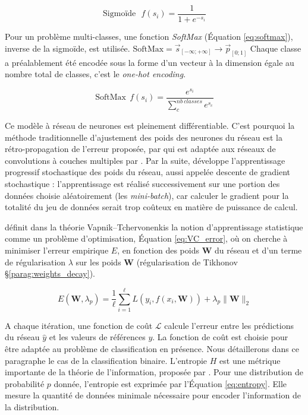\begin{equation} \label{eq:sigmoid}
\text{Sigmoïde} \ \ \ f\left(s_{i}\right)=\frac{1}{1+e^{-s_{i}}}
\end{equation}

Pour un problème multi-classes, une fonction \textit{SoftMax} (Équation \ref{eq:softmax}), inverse de la sigmoïde, est utilisée.
$\text{SoftMax} = \vec{s}_{[-\infty; +\infty]} \to \vec{p}_{[0 ; 1]}$
Chaque classe a préalablement été encodée sous la forme d'un vecteur à la dimension égale au nombre total de classes, c'est le \textit{one-hot encoding}.

\begin{equation} \label{eq:softmax}
\text{SoftMax} \ \ f(s_{i})=\frac{e^{s_{i}}}{\sum_{c}^{nb \ classes} e^{s_{c}}}
\end{equation}


Ce modèle à réseau de neurones est pleinement différentiable.
C'est pourquoi la méthode traditionnelle d'ajustement des poids des neurones du réseau est la rétro-propagation de l'erreur proposée, par \citeauthor{rumelhart_learning_1985} \cite{rumelhart_learning_1985} qui est adaptée aux réseaux de convolutions à couches multiples par \citeauthor{lecun_backpropagation_1989} \cite{lecun_backpropagation_1989}.
Par la suite, \citeauthor{lecun_efficient_1998} \cite{lecun_efficient_1998} développe l'apprentissage progressif stochastique des poids du réseau, aussi appelée descente de gradient stochastique : l'apprentissage est réalisé successivement sur une portion des données choisie aléatoirement  (les \textit{mini-batch}), car  calculer le gradient pour la totalité du jeu de données serait trop coûteux en matière de puissance de calcul.

\cite{vapnik_principles_1992} définit dans la théorie Vapnik–Tchervonenkis la notion d'apprentissage statistique comme un problème d'optimisation, Équation \ref{eq:VC_error}, où on cherche à minimiser l'erreur empirique $E$, en fonction des poids $\mathbf{W}$ du réseau et d'un terme de régularisation $\lambda$ sur les poids $\mathbf{W}$ (régularisation de Tikhonov §\ref{parag:weights_decay}).

\begin{equation} \label{eq:VC_error}
E\left(\mathbf{W}, \lambda_{p}\right)=\frac{1}{\ell} \sum_{i=1}^{\ell} L\left(y_{i}, f\left(x_{i}, \mathbf{W}\right)\right)+\lambda_{p}\|\mathbf{W}\|_{2}
\end{equation}

A chaque itération, une fonction de coût $\mathcal{L}$ calcule l'erreur entre les prédictions du réseau $\hat{y}$ et les valeurs de références $y$.
La fonction de coût est choisie pour être adaptée au problème de classification en présence.
Nous détaillerons dans ce paragraphe le cas de la classification binaire.
L'entropie $H$ est une métrique importante de la théorie de l'information, proposée par \cite{shannon_mathematical_1948}.
Pour une distribution de probabilité $p$ donnée, l'entropie est exprimée par l'Équation \ref{eq:entropy}.
Elle mesure la quantité de données minimale nécessaire pour encoder l'information de la distribution.

